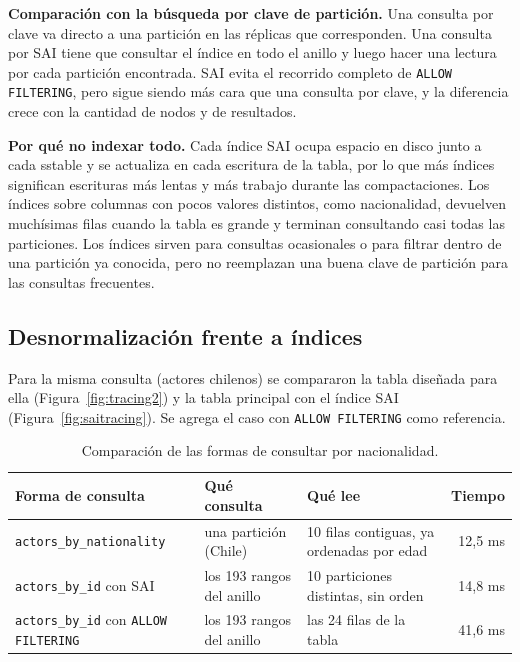 \documentclass[11pt,a4paper]{article}
\begin{document}
\textbf{Comparación con la búsqueda por clave de partición.} Una consulta por clave va directo
a una partición en las réplicas que corresponden. Una consulta por SAI tiene que consultar el
índice en todo el anillo y luego hacer una lectura por cada partición encontrada. SAI evita el
recorrido completo de \texttt{ALLOW FILTERING}, pero sigue siendo más cara que una consulta por
clave, y la diferencia crece con la cantidad de nodos y de resultados.

\textbf{Por qué no indexar todo.} Cada índice SAI ocupa espacio en disco junto a cada sstable
y se actualiza en cada escritura de la tabla, por lo que más índices significan escrituras más
lentas y más trabajo durante las compactaciones. Los índices sobre columnas con pocos valores
distintos, como nacionalidad, devuelven muchísimas filas cuando la tabla es grande y terminan
consultando casi todas las particiones. Los índices sirven para consultas ocasionales o para
filtrar dentro de una partición ya conocida, pero no reemplazan una buena clave de partición
para las consultas frecuentes.

\subsection{Desnormalización frente a índices}

Para la misma consulta (actores chilenos) se compararon la tabla diseñada para ella
(Figura~\ref{fig:tracing2}) y la tabla principal con el índice SAI
(Figura~\ref{fig:saitracing}). Se agrega el caso con \texttt{ALLOW FILTERING} como referencia.

\begin{table}[H]
	\centering
	\small
	\begin{tabularx}{\textwidth}{X X X r}
		\toprule
		\textbf{Forma de consulta} & \textbf{Qué consulta} & \textbf{Qué lee} & \textbf{Tiempo} \\
		\midrule
		\texttt{actors\_by\_nationality} & una partición (Chile) & 10 filas contiguas, ya ordenadas por edad & 12,5 ms \\
		\addlinespace
		\texttt{actors\_by\_id} con SAI & los 193 rangos del anillo & 10 particiones distintas, sin orden & 14,8 ms \\
		\addlinespace
		\texttt{actors\_by\_id} con \texttt{ALLOW FILTERING} & los 193 rangos del anillo & las 24 filas de la tabla & 41,6 ms \\
		\bottomrule
	\end{tabularx}
	\caption{Comparación de las formas de consultar por nacionalidad.}
	\label{tab:desnorm}
\end{table}
\end{document}
